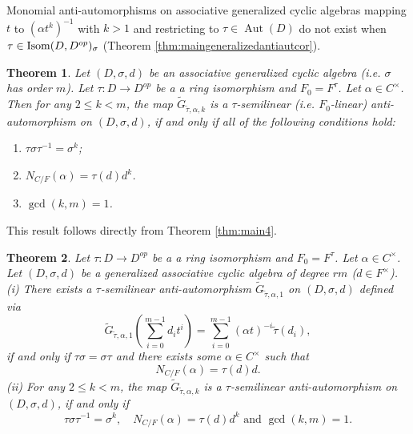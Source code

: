 \documentclass{amsart}
\theoremstyle{plain}
\newtheorem{theorem}{Theorem}[section]
\theoremstyle{definition}
\numberwithin{equation}{section}
\numberwithin{figure}{section}
\DeclareMathOperator{\Aut}{Aut}
\begin{document}
Monomial anti-automorphisms on associative generalized cyclic algebras mapping $t$ to $(\alpha t^k)^{-1}$ with $k>1$ and restricting to $\tau\in \Aut(D)$ do not exist when
$\tau\in {\rm Isom}(D,D^{op})_\sigma$ (Theorem \ref{thm:maingeneralizedantiautcor}).


\begin{theorem}\label{cor:tilde G}
Let $(D,\sigma,d)$ be an associative  generalized cyclic algebra (i.e. $\sigma$ has order $m$). Let $\tau:D\to D^{op}$ be a a ring isomorphism and $F_0=F^\tau$.
  Let $\alpha \in C^\times$.  Then for any $2\leq k < m$, the map
$\widetilde  G_{\tilde\tau,\alpha,k}$
 is a $\tau$-semilinear (i.e. $F_0$-linear) anti-automorphism on  $(D,\sigma,d)$, if and only if all of the following conditions hold:
 \begin{enumerate} \setlength{\itemsep}{0pt}
        \item \label{C:k=1c} $ \tau\sigma \tau^{-1}=\sigma^k$;
        \item \label{C:normc} $N_{C/F}(\alpha)=\tau(d)d^{k}$.
        \item \label{C:relprimec} $\gcd(k,m)=1$.
  \end{enumerate}
\end{theorem}

This result follows directly from  Theorem \ref{thm:main4}.


\begin{theorem}\label{thm:maingeneralizedantiaut2}
Let $\tau:D\to D^{op}$ be a a ring isomorphism and $F_0=F^\tau$.
Let  $\alpha\in C^\times$.
 Let  $(D,\sigma,d)$ be a generalized associative cyclic algebra of degree $rm$ ($d\in F^\times$).
\\ (i)
There exists a $\tau$-semilinear anti-automorphism $\widetilde G_{\tilde\tau,\alpha,1}$ on $(D,\sigma,d)$ defined via
$$\widetilde G_{\tilde\tau,\alpha,1}(\sum_{i=0}^{m-1}d_it^i)=\sum_{i=0}^{m-1} (\alpha t)^{-i} \tilde \tau(d_i),$$
 if and only if $\tau\sigma=\sigma\tau$ and
 there exists  some $\alpha\in C^\times$ such that
$$N_{C/F}(\alpha)= \tau(d)d.$$ 
 (ii)  For any $2\leq k < m$, the map
$\widetilde  G_{\tilde\tau,\alpha,k}$
 is a $\tau$-semilinear anti-automorphism on  $(D,\sigma,d)$, if and only if
 $$ \tau\sigma \tau^{-1}=\sigma^k,\quad N_{C/F}(\alpha)=\tau(d)d^{k}  \text{ and } \gcd(k,m)=1.$$
 \end{theorem}
\end{document}
